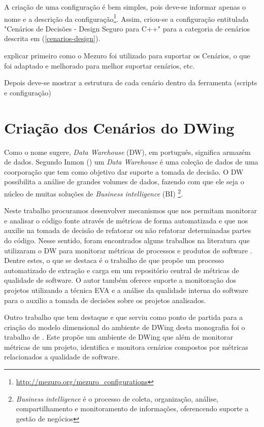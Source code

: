 A criação de uma configuração é bem simples, pois deve-se informar apenas o nome e a descrição da configuração\footnote{\url{http://mezuro.org/mezuro_configurations}}. Assim, criou-se a configuração entitulada "Cenários de Decisões - Design Seguro para C++" para a categoria de cenários descrita em (\ref{cenarios-design}).





explicar primeiro como o Mezuro foi utilizado para suportar os Cenários, o que foi adaptado e melhorado para melhor suportar cenários, etc.

Depois deve-se mostrar a estrutura de cada cenário dentro da ferramenta (scripts e configuração)

\section{Criação dos Cenários do DWing}
\label{dw-cenarios}

Como o nome sugere, \emph{Data Warehouse} (DW), em português, significa armazém de dados. Segundo Inmon (\citeyear{inmon2002}) um \emph{Data Warehouse} é uma coleção de dados de uma coorporação que tem como objetivo dar suporte a tomada de decisão. 
%
O DW possibilita a análise de grandes volumes de dados, fazendo com que ele seja o núcleo de muitas soluções de \emph{Business intelligence} (BI)
%
\footnote{\emph{Business intelligence} é o processo de coleta, organização, análise, compartilhamento e monitoramento de informações, oferencendo suporte a gestão de negócios}. 
%

Neste trabalho procuramos desenvolver mecanismos que nos permitam monitorar e analisar o código fonte através de métricas de forma automatizada e que nos auxilie na tomada de decisão de refatorar ou não refatorar determinadas partes do código. 
%
Nesse sentido, foram encontrados alguns trabalhos na literatura que utilizaram o DW para monitorar métricas de processos e produtos de software \cite{Folleco2007} \cite{Silveira2010}\cite{mazuco2011}. Dentre estes, o que se destaca é o trabalho de  \cite{Silveira2010} que propõe um processo automatizado de extração e carga em um repositório central de métricas de qualidade de software. O autor também oferece suporte a monitoração dos projetos utilizando a técnica EVA e a análise da qualidade interna do software para o auxilio a tomada de decisões sobre os projetos analisados. 

Outro trabalho que tem destaque e que serviu como ponto de partida para a criação do modelo dimensional do ambiente de DWing desta monografia foi o trabalho de \cite{rego2014}. Este propõe um ambiente de DWing que além de monitorar métricas de um projeto,  identifica e monitora cenários compostos por métricas relacionados a qualidade de software.

